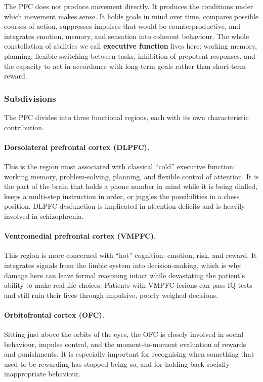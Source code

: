 \documentclass[11pt]{article}
\begin{document}
The PFC does not produce movement directly. It produces the conditions under which movement makes sense. It holds goals in mind over time, compares possible courses of action, suppresses impulses that would be counterproductive, and integrates emotion, memory, and sensation into coherent behaviour. The whole constellation of abilities we call \textbf{executive function} lives here: working memory, planning, flexible switching between tasks, inhibition of prepotent responses, and the capacity to act in accordance with long-term goals rather than short-term reward.

\subsubsection{Subdivisions}

The PFC divides into three functional regions, each with its own characteristic contribution.

\paragraph{Dorsolateral prefrontal cortex (DLPFC).} This is the region most associated with classical ``cold'' executive function: working memory, problem-solving, planning, and flexible control of attention. It is the part of the brain that holds a phone number in mind while it is being dialled, keeps a multi-step instruction in order, or juggles the possibilities in a chess position. DLPFC dysfunction is implicated in attention deficits and is heavily involved in schizophrenia.

\paragraph{Ventromedial prefrontal cortex (VMPFC).} This region is more concerned with ``hot'' cognition: emotion, risk, and reward. It integrates signals from the limbic system into decision-making, which is why damage here can leave formal reasoning intact while devastating the patient's ability to make real-life choices. Patients with VMPFC lesions can pass IQ tests and still ruin their lives through impulsive, poorly weighed decisions.

\paragraph{Orbitofrontal cortex (OFC).} Sitting just above the orbits of the eyes, the OFC is closely involved in social behaviour, impulse control, and the moment-to-moment evaluation of rewards and punishments. It is especially important for recognising when something that used to be rewarding has stopped being so, and for holding back socially inappropriate behaviour.
\end{document}
